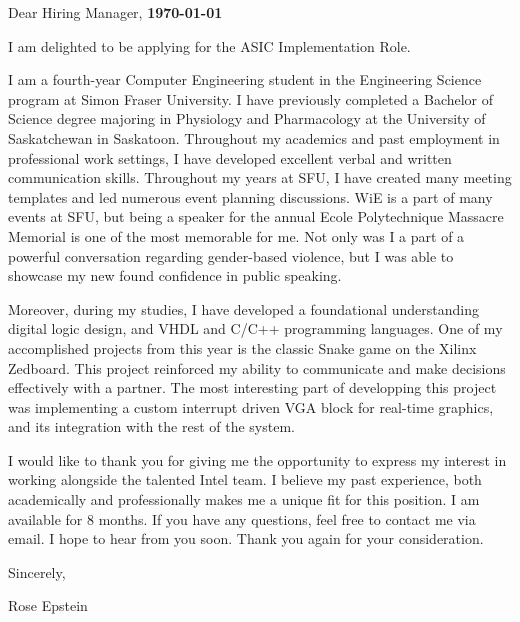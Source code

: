 \documentclass[letterpaper,11pt]{article}
\newcommand{\roleName}{ASIC Implementation Role}
\begin{document}
    \vspace*{10pt}
    \par Dear Hiring Manager,  \hfill \textbf{\today}
    \vspace*{10pt}
    \par I am delighted to be applying for the \roleName{}.
    \vspace*{10pt}
    \par I am a fourth-year Computer Engineering student in the Engineering Science program at Simon Fraser University. I have 
    previously completed a Bachelor of Science degree majoring in Physiology and Pharmacology at the University of Saskatchewan in Saskatoon.
    Throughout my academics and past employment in professional work settings, I have developed excellent verbal and written communication skills. 
    Throughout my years at SFU, I have created many meeting templates and led numerous event planning discussions. 
    WiE is a part of many events at SFU, but being a speaker for the annual Ecole Polytechnique Massacre Memorial is one of the most memorable for me. 
    Not only was I a part of a powerful conversation regarding gender-based violence, but I was able to showcase my new found confidence in public speaking. 
    \vspace*{10pt}
    \par Moreover, during my studies, I have developed a foundational understanding digital logic design, and VHDL and C/C++ programming languages. One of my accomplished projects from this year is the classic Snake game
    on the Xilinx Zedboard. This project reinforced my ability to communicate and make decisions effectively with a partner. 
    The most interesting part of developping this project was implementing a custom interrupt driven VGA block for real-time graphics, 
    and its integration with the rest of the system.
    \vspace*{10pt}
    \par I would like to thank you for giving me the opportunity to express my interest in working alongside
    the talented Intel team. I believe my past experience, both academically and professionally makes
    me a unique fit for this position. I am available for 8 months. If you have any questions, feel free to contact me via email. I hope to hear from you
    soon. Thank you again for your consideration.
    \vspace*{10pt}
    \par Sincerely,
    \par Rose Epstein
\end{document}
